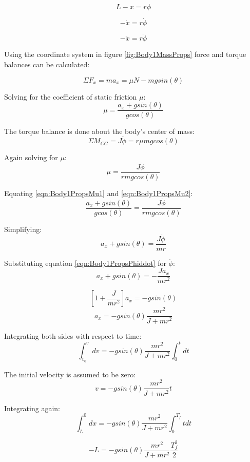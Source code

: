 \documentclass{article}
\begin{document}
	\begin{equation}
		\label{eqn:Body1PropsPhiDefinition}
		L - x = r\phi
	\end{equation}
	
	$$-\dot{x} = r \dot{\phi}$$
	
	\begin{equation}
		-\ddot{x} = r \ddot{\phi}
		\label{eqn:Body1PropsPhiddot}
	\end{equation}
	
	Using the coordinate system in figure \ref{fig:Body1MassProps} force and torque balances can be calculated:
	
	$$\Sigma F_x = ma_x = \mu N - mgsin(\theta)$$
	
	Solving for the coefficient of static friction $\mu$:	
	\begin{equation}
		\mu = \frac{a_x + gsin(\theta)}{gcos(\theta)}
		\label{eqn:Body1PropsMu1}
	\end{equation}
	
	The torque balance is done about the body's center of mass:
	$$\Sigma M_{CG} = J\ddot{\phi} = r \mu mgcos(\theta)$$
	
	Again solving for $\mu$:
	\begin{equation}
		\mu = \frac{J\ddot{\phi}}{rmgcos(\theta)}
		\label{eqn:Body1PropsMu2}
	\end{equation}
	
	Equating \ref{eqn:Body1PropsMu1} and \ref{eqn:Body1PropsMu2}:
	$$\frac{a_x + gsin(\theta)}{gcos(\theta)} = \frac{J\ddot{\phi}}{rmgcos(\theta)}$$
	
	Simplifying:
	$$a_x + gsin(\theta) = \frac{J\ddot{\phi}}{mr}$$
	
	Substituting equation \ref{eqn:Body1PropsPhiddot} for $\ddot{\phi}$:
	$$a_x + gsin(\theta) = -\frac{Ja_x}{mr^2}$$
	
	$$\left[ 1 + \frac{J}{mr^2} \right] a_x = -gsin(\theta)$$
	$$a_x = -gsin(\theta)\frac{mr^2}{J + mr^2}$$
	
	Integrating both sides with respect to time:
	$$\int_{v_0}^{v} dv = -gsin(\theta)\frac{mr^2}{J + mr^2} \int_{0}^{t} dt$$
	
	The initial velocity is assumed to be zero:
	$$v = -gsin(\theta)\frac{mr^2}{J + mr^2}t$$
	
	Integrating again:
	$$\int_{L}^{0} dx = -gsin(\theta)\frac{mr^2}{J + mr^2} \int_{0}^{T_f} t dt$$
	
	$$-L = -gsin(\theta)\frac{mr^2}{J + mr^2}\frac{T_f^2}{2}$$
	
\end{document}
